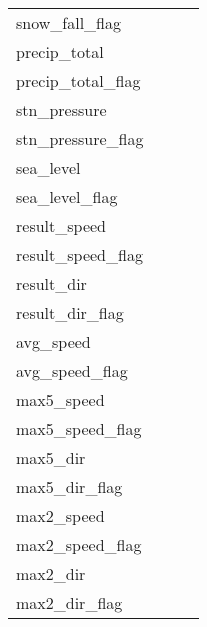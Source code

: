 \begin{longtable}{lccc}
	snow\_fall\_flag	& 	 & 			\\		
	precip\_total		& 	 & 			\\	
	precip\_total\_flag	& 	 & 		  	\\		
	stn\_pressure		& 	 & 			\\	
	stn\_pressure\_flag	& 	 & 		  	\\		
	sea\_level			& 	 & 			\\	
	sea\_level\_flag	& 	 & 			\\		
	result\_speed		& 	 & 		\\	
	result\_speed\_flag	& 	 & 		  	\\		
	result\_dir			& 	 & 		\\			
	result\_dir\_flag	& 	 & 		  	\\		
	avg\_speed			& 	 & 			\\	
	avg\_speed\_flag	& 	 & 			\\		
	max5\_speed			& 	 & 			\\	
	max5\_speed\_flag	& 	 & 		  	\\		
	max5\_dir			& 	 & 			\\
	max5\_dir\_flag		& 	 & 			\\	
	max2\_speed			& 	 & 			\\	
	max2\_speed\_flag	& 	 & 		  	\\		
	max2\_dir			& 	 & 			\\
	max2\_dir\_flag		& 	 & 		  	\\	
	\bottomrule
	
\end{longtable}
\label{tab:attributi weather}

